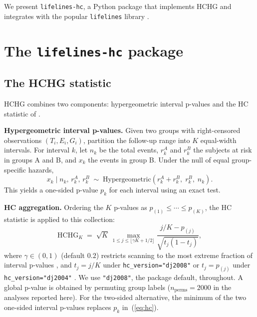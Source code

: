 \documentclass[11pt]{article}
\begin{document}
We present \texttt{lifelines-hc}, a Python package that implements HCHG and integrates with the popular \texttt{lifelines} library \citep{davidsonpilon2019}.


\section{The \texttt{lifelines-hc} package}

\subsection*{The HCHG statistic}

HCHG \citep{kipnis_biometrika} combines two components: hypergeometric
interval p-values and the HC statistic of \citet{donoho2004,donoho2015special}.

\textbf{Hypergeometric interval p-values.}
Given two groups with right-censored observations $(T_i, E_i, G_i)$,
partition the follow-up range into $K$ equal-width intervals. For
interval $k$, let $n_k$ be the total events, $r_k^A$ and $r_k^B$ the
subjects at risk in groups A and B, and $x_k$ the events in group B.
Under the null of equal group-specific hazards,
%
\begin{equation}\label{eq:hypergeom}
  x_k \;\Big|\; n_k,\, r_k^A,\, r_k^B
  \;\sim\;
  \mathrm{Hypergeometric}\!\left(r_k^A + r_k^B,\; r_k^B,\; n_k\right).
\end{equation}
%
This yields a one-sided p-value $p_k$ for each interval using an exact test.

\textbf{HC aggregation.}
Ordering the $K$ p-values as $p_{(1)} \leq \cdots \leq p_{(K)}$, the
HC statistic \citep{donoho2004,donoho2015special} is applied to this collection:
%
\begin{equation}\label{eq:hc}
  \mathrm{HCHG}_K
  \;=\;
  \sqrt{K}\,
  \max_{1 \leq j \leq \lfloor\gamma K + 1/2\rfloor}
  \frac{j/K - p_{(j)}}{\sqrt{t_j\!\left(1 - t_j\right)}},
\end{equation}
%
where $\gamma \in (0,1)$ (default $0.2$) restricts scanning to the most
extreme fraction of interval p-values \citep{donoho2004,donoho2015special},
and $t_j = j/K$ under \texttt{hc\_version="dj2008"} \citep{donoho2008} or
$t_j = p_{(j)}$ under \texttt{hc\_version="dj2004"} \citep{donoho2004}. We
use \texttt{"dj2008"}, the package default, throughout.
A global p-value is obtained by permuting group labels
($n_\mathrm{perms} = 2000$ in the analyses reported here). For the two-sided alternative,
the minimum of the two one-sided interval p-values replaces $p_k$
in~(\ref{eq:hc}).
\end{document}
